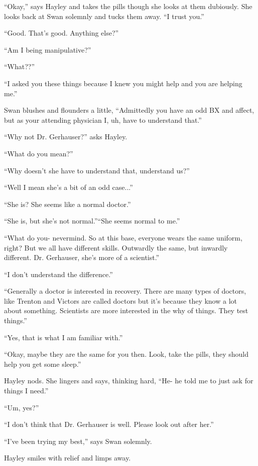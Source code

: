 ``Okay,'' says Hayley and takes the pills though she looks at them dubiously.  She looks back at Swan solemnly and tucks them away.   ``I trust you.''

``Good.  That's good.  Anything else?''

``Am I being manipulative?''

``What??''

``I asked you these things because I knew you might help and you are helping me.''

Swan blushes and flounders a little, ``Admittedly you have an odd BX and affect, but as your attending physician I, uh, have to understand that.''

``Why not Dr. Gerhauser?'' asks Hayley.

``What do you mean?''

``Why doesn't she have to understand that, understand us?''

``Well I mean she's a bit of an odd case...''

``She is?  She seems like a normal doctor.''

``She is, but she's not normal.''``She seems normal to me.''

``What do you- nevermind.  So at this base, everyone wears the same uniform, right?  But we all have different skills.  Outwardly the same, but inwardly different.  Dr. Gerhauser, she's more of a scientist.''

``I don't understand the difference.''

``Generally a doctor is interested in recovery.  There are many types of doctors, like Trenton and Victors are called doctors but it's because they know a lot about something.  Scientists are more interested in the why of things.  They test things.''

``Yes, that is what I am familiar with.''

``Okay, maybe they are the same for you then.  Look, take the pills, they should help you get some sleep.''

Hayley nods.  She lingers and says, thinking hard, ``He- he told me to just ask for things I need.''

``Um, yes?''

``I don't think that Dr. Gerhauser is well.  Please look out after her.''

``I've been trying my best,'' says Swan solemnly.

Hayley smiles with relief and limps away.




